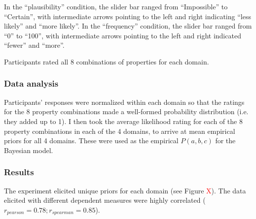 \documentclass{llncs} %
\newcommand{\denote}[1]{\mbox{ $[\![ #1 ]\!]$}}
\newcommand{\red}[1]{\textcolor{Red}{#1}}
\begin{document}
In the ``plausibility'' condition, the slider bar ranged from ``Impossible'' to ``Certain'', with intermediate arrows pointing to the left and right indicating ``less likely'' and ``more likely''. In the ``frequency'' condition, the slider bar ranged from ``0'' to ``100'', with intermediate arrows pointing to the left and right indicated ``fewer'' and ``more''. 

Participants rated all 8 combinations of properties for each domain.

\subsubsection{Data analysis}

Participants' responses were normalized within each domain so that the ratings for the 8 property combinations made a well-formed probability distribution (i.e. they added up to 1). I then took the average likelihood rating for each of the 8 property combinations in each of the 4 domains, to arrive at mean empirical priors for all 4 domains. These were used as the empirical $P(a,b,c)$ for the Bayesian model. 

\subsubsection{Results}

The experiment elicited unique priors for each domain (see Figure \red{X}). The data elicited with different dependent measures were highly correlated ($r_{pearson} = 0.78; r_{spearman} = 0.85$). 




\end{document}

